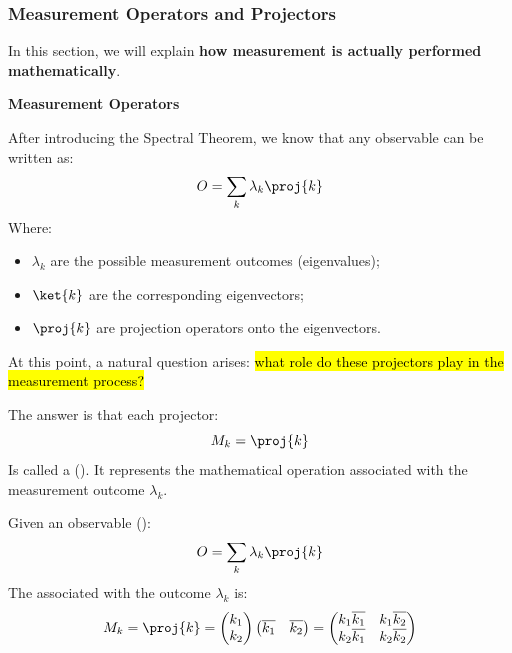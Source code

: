 \subsubsection{Measurement Operators and Projectors}

In this section, we will explain \textbf{how measurement is actually performed mathematically}.

\highspace
\begin{flushleft}
    \textcolor{Green3}{ \textbf{Measurement Operators}}
\end{flushleft}
After introducing the Spectral Theorem, we know that any observable can be written as:
\begin{equation*}
    O = \sum_k \lambda_k \proj{k}
\end{equation*}
Where:
\begin{itemize}
    \item $\lambda_k$ are the possible measurement outcomes (eigenvalues);
    \item $\ket{k}$ are the corresponding eigenvectors;
    \item $\proj{k}$ are projection operators onto the eigenvectors.
\end{itemize}
At this point, a natural question arises: \hl{what role do these projectors play in the measurement process?}

\highspace
The answer is that each projector:
\begin{equation*}
    M_k = \proj{k}
\end{equation*}
Is called a  (). It represents the mathematical operation associated with the measurement outcome $\lambda_k$.

\begin{definitionbox}
    Given an observable ():
    \begin{equation*}
        O = \sum_k \lambda_k \proj{k}
    \end{equation*}
    The  associated with the outcome $\lambda_k$ is:
    \begin{equation*}
        M_k = \proj{k} = \begin{pmatrix}
            k_{1} \\
            k_{2}
        \end{pmatrix}
        \begin{pmatrix}
            \overline{k_{1}} & \overline{k_{2}}
        \end{pmatrix}
        =
        \begin{pmatrix}
            k_{1} \overline{k_{1}} & k_{1} \overline{k_{2}} \\
            k_{2} \overline{k_{1}} & k_{2} \overline{k_{2}}
        \end{pmatrix}
    \end{equation*}
\end{definitionbox}

